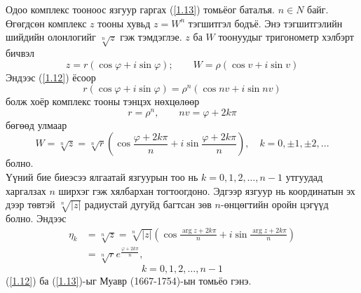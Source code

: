 Одоо комплекс тооноос язгуур гаргах (\ref{1.13}) томьёог баталъя. $n\in N$ байг. Өгөгдсөн комплекс $z$ тооны хувьд $z=W^n$ тэгшитгэл бодъё. Энэ тэгшитгэлийн шийдийн олонлогийг $\sqrt[n]{z}$ гэж тэмдэглэе. $z$ ба $W$ тоонуудыг тригонометр хэлбэрт бичвэл 
$$z=r(\cos\varphi +i\sin \varphi); \qquad W=\rho (\cos v+ i\sin v)$$ 
Эндээс (\ref{1.12}) ёсоор
$$r(\cos\varphi +i\sin \varphi)=\rho^n(\cos nv+ i\sin nv)$$
болж хоёр комплекс тооны тэнцэх нөхцөлөөр
$$r=\rho^n, \qquad nv=\varphi +2k\pi $$
бөгөөд улмаар
$$W=\sqrt[n]{z}=\sqrt[n]{r} \left(\cos \frac{\varphi +2k\pi}{n}+i\sin \frac{\varphi+2k\pi}{n}\right), \quad k=0, \pm 1, \pm 2 ,...$$ болно. \\
Үүний бие биеэсээ ялгаатай язгуурын тоо нь $k=0,1,2,\ldots ,n-1$ утгуудад харгалзах $n$ ширхэг гэж хялбархан тогтоогдоно. Эдгээр язгуур нь координатын эх дээр төвтэй $\sqrt[n]{|z|}$ радиустай дугуйд багтсан зөв $n$-өнцөгтийн оройн цэгүүд болно. Эндээс 
\begin{align*}
    \eta_k&=\sqrt[n]{z}=\sqrt[n]{|z|}\left(\cos \frac{\arg  z+2k\pi}{n}+i\sin \frac{\arg  z+2k\pi}{n}\right) \\
    &=\sqrt[n]{r}e^{\frac{\varphi+2k\pi}{n}},
\end{align*}
$$k=0,1,2,\ldots ,n-1$$
(\ref{1.12}) ба (\ref{1.13})-ыг Муавр (1667-1754)-ын томьёо  гэнэ. 

